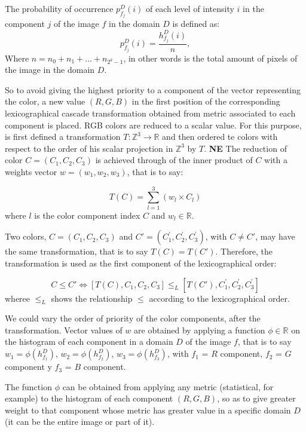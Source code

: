 The probability of occurrence $p_{f_j}^{D}(i)$ of each level of intensity $i$ in the component $j$ of the image $f$ in the domain $D$ is defined as:
\begin{equation}
\label{probabilidad}
   p_{f_j}^{D}(i) = \frac{h_{f_j}^{D}(i)}{n},
\end{equation} Where $n = n_0 + n_1 + ... + n_{2^k-1}$, in other words is the total amount of pixels of the image in the domain $D$.

So to avoid giving the highest priority to a component of the vector representing the color, a new value $(R,G,B)$ in the first position of the corresponding lexicographical cascade transformation obtained from metric associated to each component is placed. 
RGB colors are reduced to a scalar value. For this purpose, is first defined a transformation $T:\mathbb{Z}^3 \rightarrow \mathbb{R}$ and then ordered te colors with respect to the order of his scalar projection in $\mathbb{Z}^3$ by $T$. \textbf{NE} %
The reduction of color $C=(C_1,C_2,C_3)$ is achieved through of the inner product of $C$ with a weights vector $w=(w_1,w_2,w_3) $, that is to say:

\begin{equation}
\label{Transformacion}
T(C)= \sum_{l=1}^3(w_l \times C_l)
\end{equation}  
where $l$ is the color component index $C$ and $w_l \in \mathbb{R}$. 

Two colors, $C=(C_1,C_2,C_3)$ and $C'=(C_1^{'},C_2^{'},C_3^{'})$, with $C\neq C'$, may have the same transformation, that is to say $T(C) = T(C')$.  Therefore, the transformation is used as the first component of the lexicographical order:

\begin{equation}
\label{Mio} 
 C\leq C'\Leftrightarrow [T(C),C_1,C_2,C_3] \leq_L [T(C'),C_1^{'},C_2^{'},C_3^{'}]
\end{equation} wheree $\leq_L$ shows the relationship $\leq$ according to the lexicographical order.	

We could vary the order of priority of the color components, after the transformation.
Vector values of $w$ are obtained by applying a function $\phi \in \mathbb{R}$ on the histogram of each component in a domain $D$ of the image $f$, that is to say $w_1 = \phi(h_{f_1}^D)$, $w_2 = \phi(h_{f_2}^D)$, $w_3 = \phi(h_{f_3}^D)$, with $f_1$ = $R$ component, $f_2$ = $G$ component y $f_3$ =  $B$ component.

The function $\phi$ can be obtained from applying any metric (statistical, for example) to the histogram of each component $(R,G,B)$, so as to give greater weight to that component whose metric has greater value in a specific domain $D$ (it can be the entire image or part of it). 

